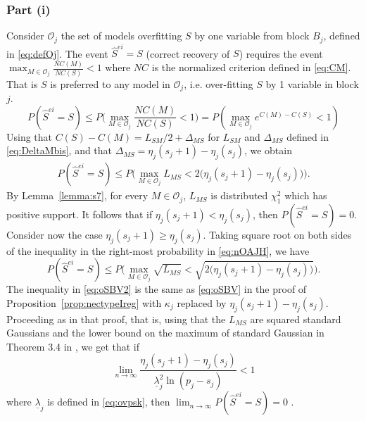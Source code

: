 \documentclass[
  12pt]{article}
\newcommand{\OO}{\mathcal{O}}
\begin{document}
\subsubsection{Part (i)}
Consider $\OO_j$ the set of models overfitting $S$ by one variable from block $B_j$, defined in \eqref{eq:defOj}. The event $\hat{S}^{ei}=S$ (correct recovery of $S$) requires the event $\max_{M\in \OO_j}\frac{NC(M)}{NC(S)}<1$ where $NC$ is the normalized criterion defined in \eqref{eq:CM}. That is $S$ is preferred to any model in $\OO_j$, i.e. over-fitting $S$ by 1 variable in block $j$. 
$$P(\hat{S}^{ei}=S) 
\leq P\Big(\max_{M\in \OO_j}\frac{NC(M)}{NC(S)}<1\Big)
= P \left( \max_{M\in \OO_j} e^{C(M)-C(S)} <1 \right)$$
Using that $C(S)-C(M)=L_{SM}/2 + \Delta_{MS}$ for $L_{SM}$ and $\Delta_{MS}$ defined in \eqref{eq:DeltaMbis}, and that $\Delta_{MS}=\eta_j(s_j+1)-\eta_j(s_j)$, we obtain
\begin{align}\label{eq:nOAJH}
P(\hat{S}^{ei}=S) 
\leq P\Big(\max_{M\in \OO_j}L_{MS}<2\big(\eta_j(s_j+1)-\eta_j(s_j)\big)\Big).
\end{align}
By Lemma~\ref{lemma:s7}, for every $M\in \OO_j$, $L_{MS}$ is distributed $\chi^2_1$ which has positive support. It follows that if $\eta_j(s_j+1)<\eta_j(s_j)$, then $P(\hat{S}^{ei}=S)=0$. Consider now the case $\eta_j(s_j+1)\geq\eta_j(s_j)$. Taking square root on both sides of the inequality in the right-most probability in \eqref{eq:nOAJH}, we have
\begin{equation}\label{eq:oSBV2}
    P(\hat{S}^{ei}=S) 
\leq P\Big(\max_{M\in \OO_j}\sqrt{L_{MS}}<\sqrt{2\big(\eta_j(s_j+1)-\eta_j(s_j)\big)}\Big).
\end{equation}
The inequality in \eqref{eq:oSBV2} is the same as \eqref{eq:oSBV} in the proof of Proposition~\ref{prop:nectypeIreg} with $\kappa_j$ replaced by $\eta_j(s_j+1)-\eta_j(s_j)$. Proceeding as in that proof, that is, using that the $L_{MS}$ are squared standard Gaussians and the lower bound on the maximum of standard Gaussian in Theorem 3.4 in \cite{hartigan}, we get that if $$\lim_{n\to\infty}\frac{\eta_j(s_j+1)-\eta_j(s_j)}{\underline{\lambda}_j^2\ln(p_j-s_j)} <1$$ where $\underline{\lambda}_j$ is defined in \eqref{eq:ovpsk}, then $\lim_{n \to \infty} P(\hat{S}^{ei}=S) = 0$ .
\end{document}
